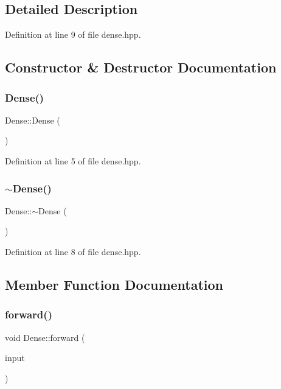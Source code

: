 \subsection{Detailed Description}


Definition at line 9 of file dense.\+hpp.



\subsection{Constructor \& Destructor Documentation}
\mbox{\label{class_dense_a484feaf4728dea6894e1eae9078d0aa1}} 
\subsubsection{\texorpdfstring{Dense()}{Dense()}}
{\footnotesize\ttfamily Dense\+::\+Dense (\begin{DoxyParamCaption}{ }\end{DoxyParamCaption})}



Definition at line 5 of file dense.\+hpp.

\mbox{\label{class_dense_a7f761043ff8fea17708fecc7bba34d8c}} 
\subsubsection{\texorpdfstring{$\sim$\+Dense()}{~Dense()}}
{\footnotesize\ttfamily Dense\+::$\sim$\+Dense (\begin{DoxyParamCaption}{ }\end{DoxyParamCaption})}



Definition at line 8 of file dense.\+hpp.



\subsection{Member Function Documentation}
\mbox{\label{class_dense_a8352bde317b3f33c033a36ce9b9e3c0e}} 
\subsubsection{\texorpdfstring{forward()}{forward()}}
{\footnotesize\ttfamily void Dense\+::forward (\begin{DoxyParamCaption}\item[{std\+::vector$<$ Eigen\+::\+Matrix\+Xd $>$}]{input }\end{DoxyParamCaption})\hspace{0.3cm}{\ttfamily [virtual]}}



